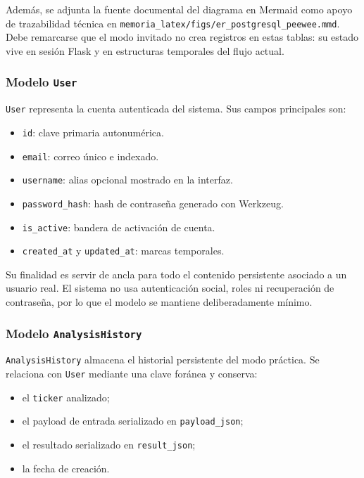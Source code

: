 Además, se adjunta la fuente documental del diagrama en Mermaid como apoyo de trazabilidad técnica en \texttt{memoria\_latex/figs/er\_postgresql\_peewee.mmd}. Debe remarcarse que el modo invitado no crea registros en estas tablas: su estado vive en sesión Flask y en estructuras temporales del flujo actual.

\subsubsection{Modelo \texttt{User}}

\texttt{User} representa la cuenta autenticada del sistema. Sus campos principales son:

\begin{itemize}
    \item \texttt{id}: clave primaria autonumérica.
    \item \texttt{email}: correo único e indexado.
    \item \texttt{username}: alias opcional mostrado en la interfaz.
    \item \texttt{password\_hash}: hash de contraseña generado con Werkzeug.
    \item \texttt{is\_active}: bandera de activación de cuenta.
    \item \texttt{created\_at} y \texttt{updated\_at}: marcas temporales.
\end{itemize}

Su finalidad es servir de ancla para todo el contenido persistente asociado a un usuario real. El sistema no usa autenticación social, roles ni recuperación de contraseña, por lo que el modelo se mantiene deliberadamente mínimo.

\subsubsection{Modelo \texttt{AnalysisHistory}}

\texttt{AnalysisHistory} almacena el historial persistente del modo práctica. Se relaciona con \texttt{User} mediante una clave foránea y conserva:

\begin{itemize}
    \item el \texttt{ticker} analizado;
    \item el payload de entrada serializado en \texttt{payload\_json};
    \item el resultado serializado en \texttt{result\_json};
    \item la fecha de creación.
\end{itemize}

